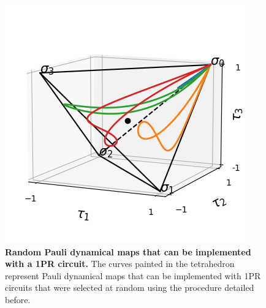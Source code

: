 \documentclass[10pt,letterpaper]{article} %
\begin{document}
\begin{figure} %
\centering
\includegraphics{images/curvas-azar.png}
\caption{{\bf Random Pauli dynamical maps that can be implemented with a 1PR circuit.}
The curves painted in the tetrahedron
represent Pauli dynamical maps that can be implemented with 1PR circuits
that were selected at random using the procedure detailed before.}
\label{fig:curves-random}
\end{figure}


\end{document}
